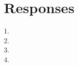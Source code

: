 \documentclass[12pt, a4paper]{article}
\begin{document}
\maketitle

\section{Responses}
1. 
\\
2.
\\
3.
\\
4.
\\
\end{document}
